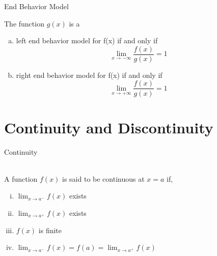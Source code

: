 \documentclass[12pt]{article}
\begin{document}
\begin{definition}{End Behavior Model}

    The function $g(x)$ is a
    \begin{enumerate}[(a)]
        \item left end behavior model for f(x) if and only if \[ \lim_{x \to -\infty} \frac{f(x)}{g(x)} = 1 \]
        \item right end behavior model for f(x) if and only if \[ \lim_{x \to +\infty} \frac{f(x)}{g(x)} = 1 \]
    \end{enumerate}
\end{definition}



\section{Continuity and Discontinuity}

\begin{theorem}{Continuity}
    
    \\ A function $f(x)$ is said to be continuous at $x=a$ if,
    \begin{enumerate}[(i)]
        \item $\lim_{x \to a^-} f(x)$ exists
        \item $\lim_{x \to a^+} f(x)$ exists
        \item $f(x)$ is finite
        \item $\lim_{x \to a^-} f(x) = f(a) = \lim_{x \to a^+} f(x)$
    \end{enumerate}
\end{theorem}



    
\end{document}
